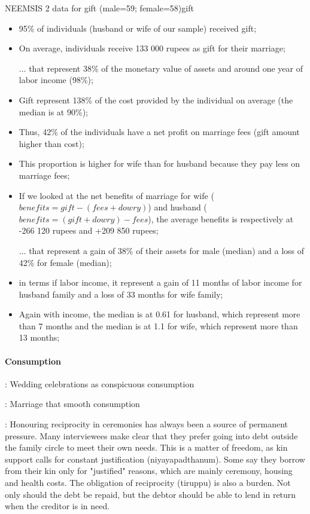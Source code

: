\documentclass[a4paper, 11pt, onecolumn]{article}
\begin{document}
\begin{greybox}{NEEMSIS 2 data for gift (male=59; female=58)}{gift}
\begin{itemize}[leftmargin=*]
\item 95\% of individuals (husband or wife of our sample) received gift; 
\item On average, individuals receive 133 000 rupees as gift for their marriage;
\item [...] that represent 38\% of the monetary value of assets and around one year of labor income (98\%);
\item Gift represent 138\% of the cost provided by the individual on average (the median is at 90\%);
\item Thus, 42\% of the individuals have a net profit on marriage fees (gift amount higher than cost);
\item This proportion is higher for wife than for husband because they pay less on marriage fees;
\item If we looked at the net benefits of marriage for wife ($benefits=gift-(fees+dowry)$) and husband ($benefits=(gift+dowry)-fees$), the average benefits is respectively at -266 120 rupees and +209 850 rupees;
\item [...] that represent a gain of 38\% of their assets for male (median) and a loss of 42\% for female (median);
\item in terms if labor income, it represent a gain of 11 months of labor income for husband family and a loss of 33 months for wife family;
\item Again with income, the median is at 0.61 for husband, which represent more than 7 months and the median is at 1.1 for wife, which represent more than 13 months;
\end{itemize}
\end{greybox}



\paragraph{Consumption}
\cite{Bloch2004} : Wedding celebrations as conspicuous consumption

\cite{Rosenzweig1989} : Marriage that smooth consumption

\cite{Guerin2014a} : Honouring reciprocity in ceremonies has always been a source of permanent pressure.
Many interviewees make clear that they prefer going into debt outside the family circle
to meet their own needs. This is a matter of freedom, as kin support calls for constant
justification (niyayapadthanum). Some say they borrow from their kin only for
"justified" reasons, which are mainly ceremony, housing and health costs. The
obligation of reciprocity (tiruppu) is also a burden. Not only should the debt be repaid,
but the debtor should be able to lend in return when the creditor is in need. 
\end{document}
